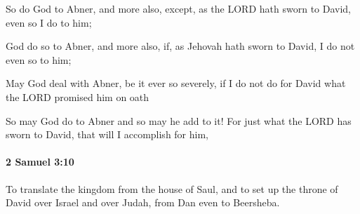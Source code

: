 			So do God to Abner, and more also, except, as the LORD hath sworn to David, even so I do to him;

			\begin{versebox}
					\item[BHS] 
					\item[ASV] God do so to Abner, and more also, if, as Jehovah hath sworn to David, I do not even so to him;
					\item[NIV] May God deal with Abner, be it ever so severely, if I do not do for David what the LORD promised him on oath
					\item[NRSV] So may God do to Abner and so may he add to it! For just what the LORD has sworn to David, that will I accomplish for him,
			\end{versebox}

		\paragraph{2 Samuel 3:10} %
			\label{2SAMUEL-3-10}

			To translate the kingdom from the house of Saul, and to set up the throne of David over Israel and over Judah, from Dan even to Beersheba.

